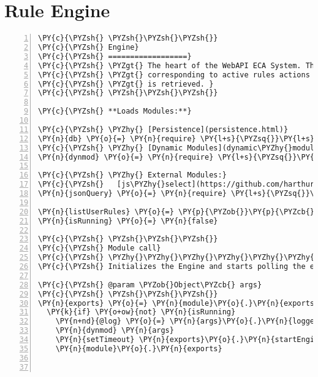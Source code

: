 \clearpage
\section{Rule Engine}
\begin{Verbatim}[fontsize=\scriptsize,commandchars=\\\{\},numbers=left,firstnumber=1,stepnumber=1]
\PY{c}{\PYZsh{} \PYZsh{}\PYZsh{}\PYZsh{}}
\PY{c}{\PYZsh{} Engine}
\PY{c}{\PYZsh{} ==================}
\PY{c}{\PYZsh{} \PYZgt{} The heart of the WebAPI ECA System. The engine loads action invoker modules}
\PY{c}{\PYZsh{} \PYZgt{} corresponding to active rules actions and invokes them if an appropriate event}
\PY{c}{\PYZsh{} \PYZgt{} is retrieved. }
\PY{c}{\PYZsh{} \PYZsh{}\PYZsh{}\PYZsh{}}

\PY{c}{\PYZsh{} **Loads Modules:**}

\PY{c}{\PYZsh{} \PYZhy{} [Persistence](persistence.html)}
\PY{n}{db} \PY{o}{=} \PY{n}{require} \PY{l+s}{\PYZsq{}}\PY{l+s}{./persistence}\PY{l+s}{\PYZsq{}}
\PY{c}{\PYZsh{} \PYZhy{} [Dynamic Modules](dynamic\PYZhy{}modules.html)}
\PY{n}{dynmod} \PY{o}{=} \PY{n}{require} \PY{l+s}{\PYZsq{}}\PY{l+s}{./dynamic\PYZhy{}modules}\PY{l+s}{\PYZsq{}}

\PY{c}{\PYZsh{} \PYZhy{} External Modules:}
\PY{c}{\PYZsh{}   [js\PYZhy{}select](https://github.com/harthur/js\PYZhy{}select)}
\PY{n}{jsonQuery} \PY{o}{=} \PY{n}{require} \PY{l+s}{\PYZsq{}}\PY{l+s}{js\PYZhy{}select}\PY{l+s}{\PYZsq{}}

\PY{n}{listUserRules} \PY{o}{=} \PY{p}{\PYZob{}}\PY{p}{\PYZcb{}}
\PY{n}{isRunning} \PY{o}{=} \PY{n}{false}

\PY{c}{\PYZsh{} \PYZsh{}\PYZsh{}\PYZsh{}}
\PY{c}{\PYZsh{} Module call}
\PY{c}{\PYZsh{} \PYZhy{}\PYZhy{}\PYZhy{}\PYZhy{}\PYZhy{}\PYZhy{}\PYZhy{}\PYZhy{}\PYZhy{}\PYZhy{}\PYZhy{}}
\PY{c}{\PYZsh{} Initializes the Engine and starts polling the event queue for new events.}

\PY{c}{\PYZsh{} @param \PYZob{}Object\PYZcb{} args}
\PY{c}{\PYZsh{} \PYZsh{}\PYZsh{}\PYZsh{}}
\PY{n}{exports} \PY{o}{=} \PY{n}{module}\PY{o}{.}\PY{n}{exports} \PY{o}{=} \PY{p}{(} \PY{n}{args} \PY{p}{)} \PY{o}{=}\PY{o}{\PYZgt{}}
  \PY{k}{if} \PY{o+ow}{not} \PY{n}{isRunning}
    \PY{n+nd}{@log} \PY{o}{=} \PY{n}{args}\PY{o}{.}\PY{n}{logger}
    \PY{n}{dynmod} \PY{n}{args}
    \PY{n}{setTimeout} \PY{n}{exports}\PY{o}{.}\PY{n}{startEngine}\PY{p}{,} \PY{l+m+mi}{10} \PY{c}{\PYZsh{} Very important, this forks a token for the poll task}
    \PY{n}{module}\PY{o}{.}\PY{n}{exports}



\end{Verbatim}
